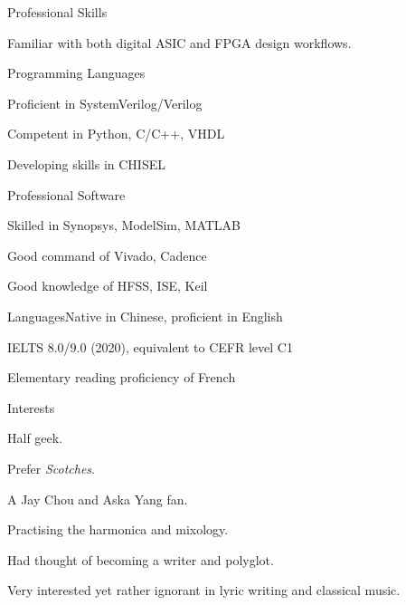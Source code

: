 \documentclass{resume} %
\begin{document}
\begin{rSection}{Professional Skills}

	Familiar with both digital ASIC and FPGA design workflows. 
	
	\begin{rSubsection}{Programming Languages}{}{}{}
		\item Proficient in SystemVerilog/Verilog
		\item Competent in Python, C/C++, VHDL
		\item Developing skills in CHISEL
	\end{rSubsection}

	\begin{rSubsection}{Professional Software}{}{}{}
		\item Skilled in Synopsys, ModelSim, MATLAB 
		\item Good command of Vivado, Cadence
		\item Good knowledge of HFSS, ISE, Keil
	\end{rSubsection}

	\begin{rSubsection}{Languages}{}{Native in Chinese, proficient in English}{}
		\item IELTS 8.0/9.0 (2020), equivalent to CEFR level C1
		\item Elementary reading proficiency of French
	\end{rSubsection}

\end{rSection}

\begin{rSection}{Interests}
	\item Half geek. 
	\item Prefer \textit{Scotches}.
	\item A Jay Chou and Aska Yang fan. 
	\item Practising the harmonica and mixology.
	\item Had thought of becoming a writer and polyglot. 
	\item Very interested yet rather ignorant in lyric writing and classical music. 
\end{rSection}
\end{document}
